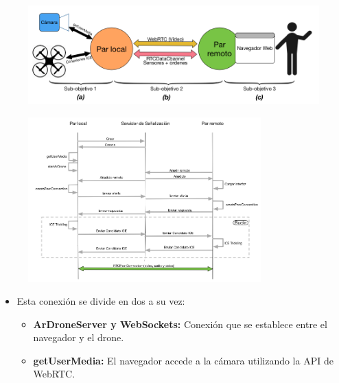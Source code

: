 \documentclass[notes,slidesec,a4]{seminar}
\begin{document}


\begin{hslide}
\begin{center}
\begin{figure}
\includegraphics[width=1.1\textwidth]{img/esquema_general}
\end{figure}
\end{center}
\end{hslide}




\begin{hslide}
\begin{center}
\begin{figure}
\includegraphics[width=0.8\textwidth]{img/diagrama_general}
\end{figure}
\end{center}
\end{hslide}


\begin{hslide}
\begin{itemize}
\item Esta conexión se divide en dos a su vez:
\begin{itemize}
\item \textbf{ArDroneServer y WebSockets:} Conexión que se establece entre el navegador y el drone.
\item \textbf{getUserMedia:} El navegador accede a la cámara utilizando la API de WebRTC.
\end{itemize}
\end{itemize}
\end{hslide}
\end{document}
